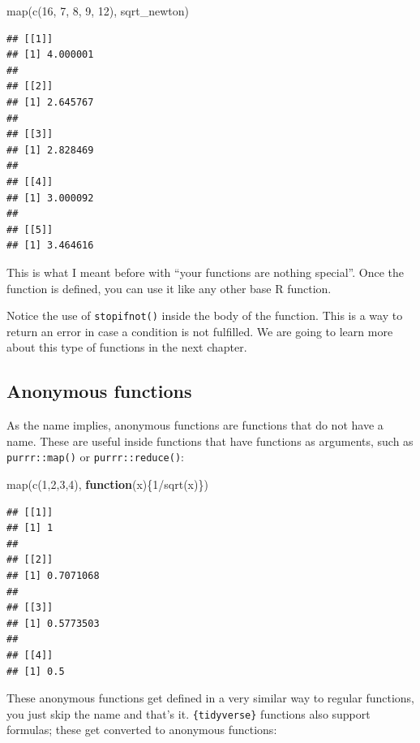 \documentclass[
]{article}
\newenvironment{Shaded}{\begin{snugshade}}{\end{snugshade}}
\newcommand{\ControlFlowTok}[1]{\textcolor[rgb]{0.13,0.29,0.53}{\textbf{#1}}}
\newcommand{\DecValTok}[1]{\textcolor[rgb]{0.00,0.00,0.81}{#1}}
\newcommand{\FunctionTok}[1]{\textcolor[rgb]{0.00,0.00,0.00}{#1}}
\newcommand{\NormalTok}[1]{#1}
\newcommand{\SpecialCharTok}[1]{\textcolor[rgb]{0.00,0.00,0.00}{#1}}
\begin{document}
\begin{Shaded}
\begin{Highlighting}[]
\FunctionTok{map}\NormalTok{(}\FunctionTok{c}\NormalTok{(}\DecValTok{16}\NormalTok{, }\DecValTok{7}\NormalTok{, }\DecValTok{8}\NormalTok{, }\DecValTok{9}\NormalTok{, }\DecValTok{12}\NormalTok{), sqrt\_newton)}
\end{Highlighting}
\end{Shaded}

\begin{verbatim}
## [[1]]
## [1] 4.000001
## 
## [[2]]
## [1] 2.645767
## 
## [[3]]
## [1] 2.828469
## 
## [[4]]
## [1] 3.000092
## 
## [[5]]
## [1] 3.464616
\end{verbatim}

This is what I meant before with ``your functions are nothing special''. Once the function is
defined, you can use it like any other base R function.

Notice the use of \texttt{stopifnot()} inside the body of the function. This is a way to return an error
in case a condition is not fulfilled. We are going to learn more about this type of functions
in the next chapter.

\hypertarget{anonymous-functions}{%
\subsection{Anonymous functions}\label{anonymous-functions}}

As the name implies, anonymous functions are functions that do not have a name. These are useful inside
functions that have functions as arguments, such as \texttt{purrr::map()} or \texttt{purrr::reduce()}:

\begin{Shaded}
\begin{Highlighting}[]
\FunctionTok{map}\NormalTok{(}\FunctionTok{c}\NormalTok{(}\DecValTok{1}\NormalTok{,}\DecValTok{2}\NormalTok{,}\DecValTok{3}\NormalTok{,}\DecValTok{4}\NormalTok{), }\ControlFlowTok{function}\NormalTok{(x)\{}\DecValTok{1}\SpecialCharTok{/}\FunctionTok{sqrt}\NormalTok{(x)\})}
\end{Highlighting}
\end{Shaded}

\begin{verbatim}
## [[1]]
## [1] 1
## 
## [[2]]
## [1] 0.7071068
## 
## [[3]]
## [1] 0.5773503
## 
## [[4]]
## [1] 0.5
\end{verbatim}

These anonymous functions get defined in a very similar way to regular functions, you just skip the
name and that's it. \texttt{\{tidyverse\}} functions also support formulas; these get converted to anonymous functions:
\end{document}
